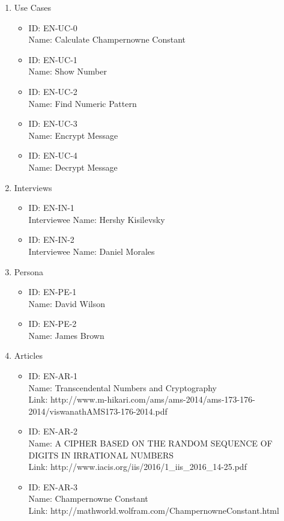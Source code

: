 \documentclass{report}
\begin{document}
\begin{enumerate}
    \item Use Cases
    \begin{itemize}
        \item ID: EN-UC-0 \\
              Name: Calculate Champernowne Constant
        \item ID: EN-UC-1 \\
              Name: Show Number
        \item ID: EN-UC-2 \\
              Name: Find Numeric Pattern
        \item ID: EN-UC-3 \\
              Name: Encrypt Message
        \item ID: EN-UC-4 \\
              Name: Decrypt Message
    \end{itemize}
    
    \item Interviews
        \begin{itemize}
        \item ID: EN-IN-1 \\
              Interviewee Name: Hershy Kisilevsky
        \item ID: EN-IN-2 \\
              Interviewee Name: Daniel Morales
        \end{itemize}
    
    \item Persona
        \begin{itemize}
        \item ID: EN-PE-1 \\
              Name: David Wilson
        \item ID: EN-PE-2 \\
              Name: James Brown
        \end{itemize}
        
    \item Articles
        \begin{itemize}
        \item ID: EN-AR-1 \\
              Name: Transcendental Numbers and Cryptography \\
              Link: http://www.m-hikari.com/ams/ams-2014/ams-173-176-2014/viswanathAMS173-176-2014.pdf
        \item ID: EN-AR-2 \\
              Name: A CIPHER BASED ON THE RANDOM SEQUENCE OF DIGITS IN IRRATIONAL NUMBERS \\
              Link: http://www.iacis.org/iis/2016/1\_iis\_2016\_14-25.pdf
        \item ID: EN-AR-3 \\
              Name: Champernowne Constant \\
              Link: http://mathworld.wolfram.com/ChampernowneConstant.html
        \end{itemize}
        

\end{enumerate}
\end{document}
